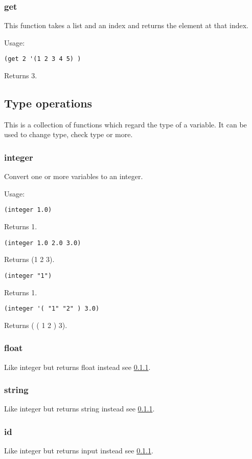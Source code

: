 \subsubsection{get}

This function takes a list and an index and returns the element at that index.

Usage:
\begin{lstlisting}
(get 2 '(1 2 3 4 5) )
\end{lstlisting}
Returns 3.


\subsection{Type operations}

This is a collection of functions which regard the type of a variable. 
It can be used to change type, check type or more. 

\subsubsection{integer} \label{type:integer}

Convert one or more variables to an integer.

Usage:
\begin{lstlisting}
(integer 1.0)
\end{lstlisting}
Returns 1.
\begin{lstlisting}
(integer 1.0 2.0 3.0)
\end{lstlisting}
Returns (1 2 3).
\begin{lstlisting}
(integer "1")
\end{lstlisting}
Returns 1.
\begin{lstlisting}
(integer '( "1" "2" ) 3.0)
\end{lstlisting}
Returns ( ( 1 2 )  3).

\subsubsection{float}

Like integer but returns float instead see \ref{type:integer}. 


\subsubsection{string}

Like integer but returns string instead see \ref{type:integer}.

\subsubsection{id}

Like integer but returns input instead see \ref{type:integer}.

